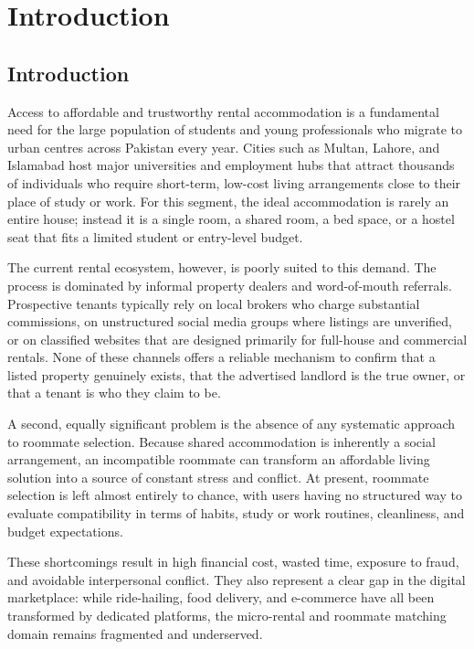 
\chapter{Introduction}


\section{Introduction}

Access to affordable and trustworthy rental accommodation is a fundamental need for the large population of students and young professionals who migrate to urban centres across Pakistan every year. Cities such as Multan, Lahore, and Islamabad host major universities and employment hubs that attract thousands of individuals who require short-term, low-cost living arrangements close to their place of study or work. For this segment, the ideal accommodation is rarely an entire house; instead it is a single room, a shared room, a bed space, or a hostel seat that fits a limited student or entry-level budget.

The current rental ecosystem, however, is poorly suited to this demand. The process is dominated by informal property dealers and word-of-mouth referrals. Prospective tenants typically rely on local brokers who charge substantial commissions, on unstructured social media groups where listings are unverified, or on classified websites that are designed primarily for full-house and commercial rentals. None of these channels offers a reliable mechanism to confirm that a listed property genuinely exists, that the advertised landlord is the true owner, or that a tenant is who they claim to be.

A second, equally significant problem is the absence of any systematic approach to roommate selection. Because shared accommodation is inherently a social arrangement, an incompatible roommate can transform an affordable living solution into a source of constant stress and conflict. At present, roommate selection is left almost entirely to chance, with users having no structured way to evaluate compatibility in terms of habits, study or work routines, cleanliness, and budget expectations.

These shortcomings result in high financial cost, wasted time, exposure to fraud, and avoidable interpersonal conflict. They also represent a clear gap in the digital marketplace: while ride-hailing, food delivery, and e-commerce have all been transformed by dedicated platforms, the micro-rental and roommate matching domain remains fragmented and underserved.

